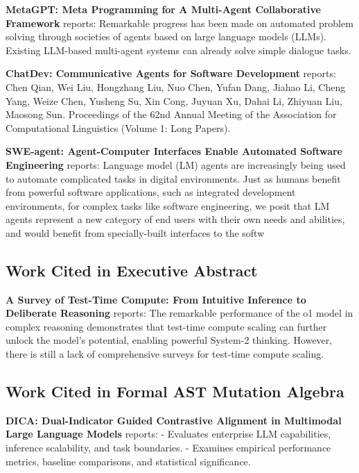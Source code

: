 \documentclass[10pt,twocolumn,letterpaper]{article}
\begin{document}
\textbf{MetaGPT: Meta Programming for A Multi-Agent Collaborative Framework} \cite{crossref_10_48550_arxiv_2308_00352} reports: Remarkable progress has been made on automated problem solving through societies of agents based on large language models (LLMs). Existing LLM-based multi-agent systems can already solve simple dialogue tasks.

\textbf{ChatDev: Communicative Agents for Software Development} \cite{crossref_10_18653_v1_2024_acl_long_810} reports: Chen Qian, Wei Liu, Hongzhang Liu, Nuo Chen, Yufan Dang, Jiahao Li, Cheng Yang, Weize Chen, Yusheng Su, Xin Cong, Juyuan Xu, Dahai Li, Zhiyuan Liu, Maosong Sun. Proceedings of the 62nd Annual Meeting of the Association for Computational Linguistics (Volume 1: Long Papers).

\textbf{SWE-agent: Agent-Computer Interfaces Enable Automated Software Engineering} \cite{crossref_10_48550_arxiv_2405_15793} reports: Language model (LM) agents are increasingly being used to automate complicated tasks in digital environments. Just as humans benefit from powerful software applications, such as integrated development environments, for complex tasks like software engineering, we posit that LM agents represent a new category of end users with their own needs and abilities, and would benefit from specially-built interfaces to the softw


\subsection{Work Cited in Executive Abstract}


\textbf{A Survey of Test-Time Compute: From Intuitive Inference to Deliberate Reasoning} \cite{arxiv_2501_02497} reports: The remarkable performance of the o1 model in complex reasoning demonstrates that test-time compute scaling can further unlock the model's potential, enabling powerful System-2 thinking. However, there is still a lack of comprehensive surveys for test-time compute scaling.


\subsection{Work Cited in Formal AST Mutation Algebra}


\textbf{DICA: Dual-Indicator Guided Contrastive Alignment in Multimodal Large Language Models} \cite{crossref_10_18653_v1_2026_findings_acl_1933} reports: - Evaluates enterprise LLM capabilities, inference scalability, and task boundaries. - Examines empirical performance metrics, baseline comparisons, and statistical significance.
\end{document}
